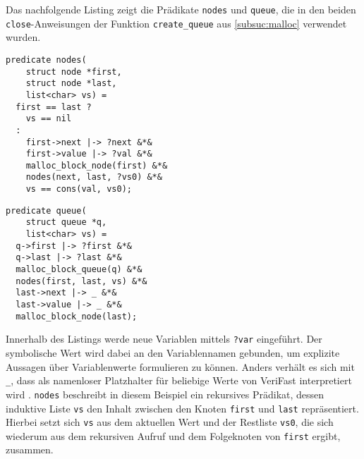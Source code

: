 %		
%		

Das nachfolgende Listing zeigt die Prädikate \texttt{nodes} und \texttt{queue}, die in den beiden \texttt{close}-Anweisungen der Funktion \texttt{create\_queue} aus \cref{subsuc:malloc} verwendet wurden.

\vspace{-10pt}
{\noindent
\begin{minipage}[t]{.45\textwidth}
\begin{lstlisting}
predicate nodes(
    struct node *first,
    struct node *last,
    list<char> vs) =
  first == last ?
    vs == nil
  :
    first->next |-> ?next &*&
    first->value |-> ?val &*&
    malloc_block_node(first) &*&
    nodes(next, last, ?vs0) &*&
    vs == cons(val, vs0);
\end{lstlisting}
\end{minipage}
\hfill
\begin{minipage}[t]{.45\textwidth}
\begin{lstlisting}
predicate queue(
    struct queue *q,
    list<char> vs) =
  q->first |-> ?first &*&
  q->last |-> ?last &*&
  malloc_block_queue(q) &*&
  nodes(first, last, vs) &*&
  last->next |-> _ &*&
  last->value |-> _ &*&
  malloc_block_node(last);
\end{lstlisting}
\end{minipage}
}

\noindent
Innerhalb des Listings werde neue Variablen mittels \texttt{?var} eingeführt. Der symbolische Wert wird dabei an den Variablennamen gebunden, um explizite Aussagen über Variablenwerte formulieren zu können. Anders verhält es sich mit \texttt{\_}, dass als namenloser Platzhalter für beliebige Werte von VeriFast interpretiert wird \cite{Jacobs2017}. \texttt{nodes} beschreibt in diesem Beispiel ein rekursives Prädikat, dessen induktive Liste \texttt{vs} den Inhalt zwischen den Knoten \texttt{first} und \texttt{last} repräsentiert. Hierbei setzt sich \texttt{vs} aus dem aktuellen Wert und der Restliste \texttt{vs0}, die sich wiederum aus dem rekursiven Aufruf und dem Folgeknoten von \texttt{first} ergibt, zusammen.

